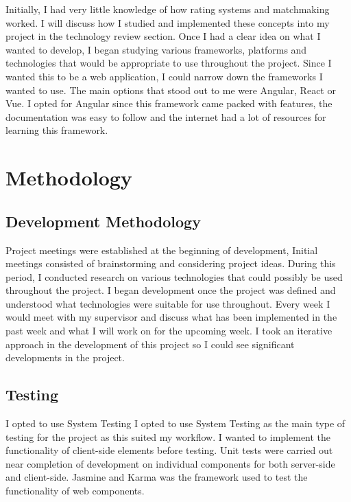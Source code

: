 Initially, I had very little knowledge of how rating systems and matchmaking worked. I will discuss how I studied and implemented these concepts into my project in the technology review section. Once I had a clear idea on what I wanted to develop, I began studying various frameworks, platforms and technologies that would be appropriate to use throughout the project. Since I wanted this to be a web application, I could narrow down the frameworks I wanted to use. The main options that stood out to me were Angular, React or Vue. I opted for Angular since this framework came packed with features, the documentation was easy to follow and the internet had a lot of resources for learning this framework.


\chapter{Methodology}
\section{Development Methodology}
Project meetings were established at the beginning of development, Initial meetings consisted of brainstorming and considering project ideas. During this period, I conducted research on various technologies that could possibly be used throughout the project. I began development once the project was defined and understood what technologies were suitable for use throughout. Every week I would meet with my supervisor and discuss what has been implemented in the past week and what I will work on for the upcoming week. I took an iterative approach in the development of this project so I could see significant developments in the project.
\section{Testing}
I opted to use System Testing
I opted to use System Testing as the main type of testing for the project as this suited my workflow. I wanted to implement the functionality of client-side elements before testing. Unit tests were carried out near completion of development on individual components for both server-side and client-side. Jasmine and Karma was the framework used to test the functionality of web components.

